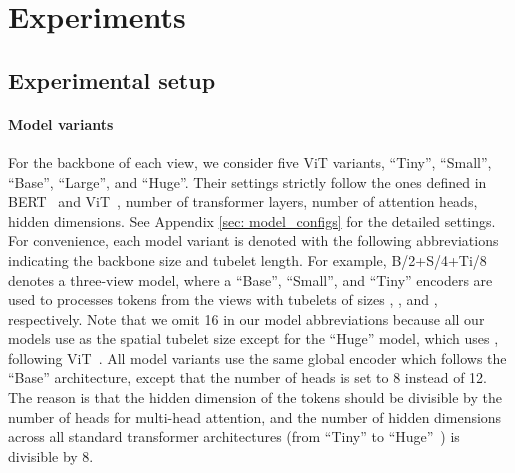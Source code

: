 \section{Experiments}
\subsection{Experimental setup}

\paragraph{Model variants} For the backbone of each view, we consider five ViT variants, ``Tiny'', ``Small'', ``Base'', ``Large'', and ``Huge''. Their settings strictly follow the ones defined in BERT~\cite{devlin_naacl_2019} and ViT~\cite{dosovitskiy2020image, steiner2021train}, \ie number of transformer layers, number of attention heads, hidden dimensions.
See Appendix \ref{sec: model_configs} for the detailed settings.
For convenience, each model variant is denoted with the following abbreviations indicating the backbone size and tubelet length.
For example, B/2+S/4+Ti/8 denotes a three-view model, where a ``Base'', ``Small'', and ``Tiny'' encoders are used to processes tokens from the views with tubelets of sizes , , and , respectively.
Note that we omit 16 in our model abbreviations because all our models use  as the spatial tubelet size except for the ``Huge'' model, which uses , following ViT~\cite{dosovitskiy2020image}.
All model variants use the same global encoder which follows the ``Base'' architecture, except that the number of heads is set to 8 instead of 12.
The reason is that the hidden dimension of the tokens should be divisible by the number of heads for multi-head attention, and the number of hidden dimensions across all standard transformer architectures (from ``Tiny'' to ``Huge''~\cite{steiner2021train, dosovitskiy2020image}) is divisible by 8.



